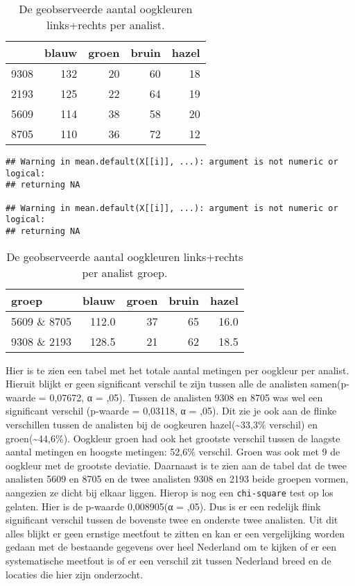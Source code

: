 \documentclass[
]{article}
\begin{document}
\begin{longtable}[t]{l|r|r|r|r}
\caption{\label{tab:analist-oogkleur-chi-square}De geobserveerde aantal oogkleuren links+rechts per analist.}\\
\hline
  & blauw & groen & bruin & hazel\\
\hline
9308 & 132 & 20 & 60 & 18\\
\hline
2193 & 125 & 22 & 64 & 19\\
\hline
5609 & 114 & 38 & 58 & 20\\
\hline
8705 & 110 & 36 & 72 & 12\\
\hline
\end{longtable}

\begin{verbatim}
## Warning in mean.default(X[[i]], ...): argument is not numeric or logical:
## returning NA

## Warning in mean.default(X[[i]], ...): argument is not numeric or logical:
## returning NA
\end{verbatim}

\begin{longtable}[t]{l|r|r|r|r}
\caption{\label{tab:analist-oogkleur-chi-square}De geobserveerde aantal oogkleuren links+rechts per analist groep.}\\
\hline
groep & blauw & groen & bruin & hazel\\
\hline
5609 \& 8705 & 112.0 & 37 & 65 & 16.0\\
\hline
9308 \& 2193 & 128.5 & 21 & 62 & 18.5\\
\hline
\end{longtable}

Hier is te zien een tabel met het totale aantal metingen per oogkleur
per analist. Hieruit blijkt er geen significant verschil te zijn tussen
alle de analisten samen(p-waarde = 0,07672, α = ,05). Tussen de
analisten 9308 en 8705 was wel een significant verschil (p-waarde =
0,03118, α = ,05). Dit zie je ook aan de flinke verschillen tussen de
analisten bij de oogkeuren hazel(\textasciitilde33,3\% verschil) en groen(\textasciitilde44,6\%).
Oogkleur groen had ook het grootste verschil tussen de laagste aantal
metingen en hoogste metingen: 52,6\% verschil. Groen was ook met 9 de
oogkleur met de grootste deviatie. Daarnaast is te zien aan de tabel dat
de twee analisten 5609 en 8705 en de twee analisten 9308 en 2193 beide
groepen vormen, aangezien ze dicht bij elkaar liggen. Hierop is nog een
\texttt{chi-square} test op los gelaten. Hier is de p-waarde 0,008905(α = ,05).
Dus is er een redelijk flink significant verschil tussen de bovenste
twee en onderste twee analisten. Uit dit alles blijkt er geen ernstige
meetfout te zitten en kan er een vergelijking worden gedaan met de
bestaande gegevens over heel Nederland om te kijken of er een
systematische meetfout is of er een verschil zit tussen Nederland breed
en de locaties die hier zijn onderzocht.
\end{document}
